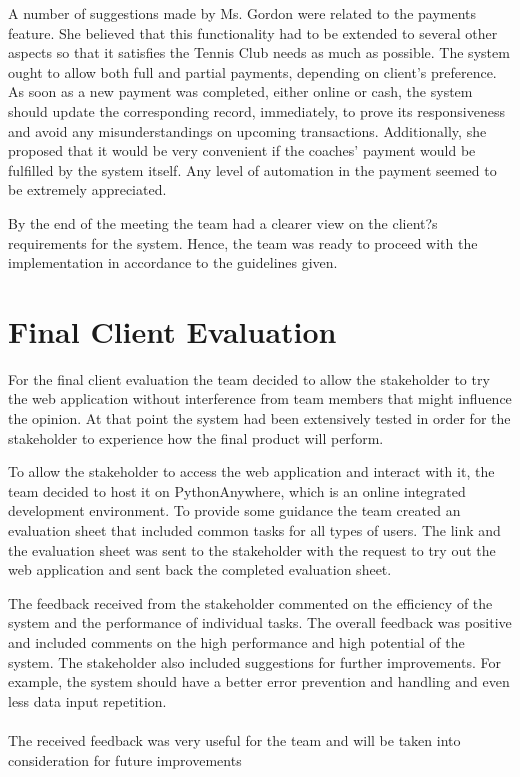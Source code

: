 \documentclass{l3proj}
\begin{document}
\par
A number of suggestions made by Ms. Gordon were related to the payments feature. She believed that this functionality had to be extended to several other aspects so that it satisfies the Tennis Club needs as much as possible. The system ought to allow both full and partial payments, depending on client's preference. As soon as a new payment was completed, either online or cash, the system should update the corresponding record, immediately, to prove its responsiveness and avoid any misunderstandings on upcoming transactions. Additionally, she proposed that it would be very convenient if the coaches' payment would be fulfilled by the system itself. Any level of automation in the payment seemed to be extremely appreciated.\\
\par
By the end of the meeting the team had a clearer view on the client?s requirements for the system. Hence, the team was ready to proceed with the implementation in accordance to the guidelines given.




\section{Final Client Evaluation}
For the final client evaluation the team decided to allow the stakeholder to try the web application without interference from team members that might influence the opinion. At that point the system had been extensively tested in order for the stakeholder to experience how the final product will perform.\\
\par
To allow the stakeholder to access the web application and interact with it, the team decided to host it on PythonAnywhere, which is an online integrated development environment. To provide some guidance the team created an evaluation sheet that included common tasks for all types of users. The link and the evaluation sheet was sent to the stakeholder with the request to try out the web application and sent back the completed evaluation sheet.\\
\par
The feedback received from the stakeholder commented on the efficiency of the system and the performance of individual tasks. The overall feedback was positive and included comments on the high performance and high potential of the system. The stakeholder also included suggestions for further improvements. For example, the system should have a better error prevention and handling and even less data input repetition.\\
\\
The received feedback was very useful for the team and will be taken into consideration for future improvements
\end{document}

